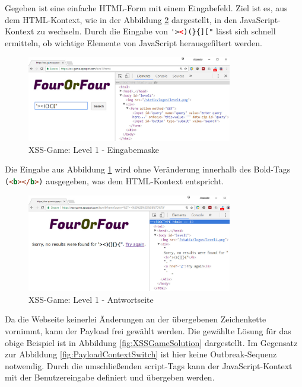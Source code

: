 		Gegeben ist eine einfache HTML-Form mit einem Eingabefeld. Ziel ist es, aus dem HTML-Kontext, wie in der Abbildung \ref{fig:XSSGameLevelOneResponse} dargestellt, in den JavaScript-Kontext zu wechseln. Durch die Eingabe von \lstinline[language=html]!'><)(}{]["! lässt sich schnell ermitteln, ob wichtige Elemente von JavaScript herausgefiltert werden. 
		
		\begin{figure}[htbp] 
			\centering
			\includegraphics[width=0.80\textwidth]{contents/images/XSSGameLevelOneRequest}
			\caption{XSS-Game: Level 1 - Eingabemaske}
			\label{fig:XSSGameLevelOneRequest}
		\end{figure}
		
		Die Eingabe aus Abbildung \ref{fig:XSSGameLevelOneRequest} wird ohne Veränderung innerhalb des Bold-Tags \lstinline[language=html]!(<b></b>)! ausgegeben, was dem HTML-Kontext entspricht.
		
		\begin{figure}[htbp] 
			\centering	\includegraphics[width=0.80\textwidth]{contents/images/XSSGameLevelOneResponse}
			\caption{XSS-Game: Level 1 - Antwortseite}
			\label{fig:XSSGameLevelOneResponse}
		\end{figure}
\FloatBarrier
		Da die Webseite keinerlei Änderungen an der übergebenen Zeichenkette vornimmt, kann der Payload frei gewählt werden. Die gewählte Lösung für das obige Beispiel ist in Abbildung \ref{fig:XSSGameSolution} dargestellt. Im Gegensatz zur Abbildung \ref{fig:PayloadContextSwitch} ist hier keine Outbreak-Sequenz notwendig. Durch die umschließenden script-Tags kann der JavaScript-Kontext mit der Benutzereingabe definiert und übergeben werden.
		
